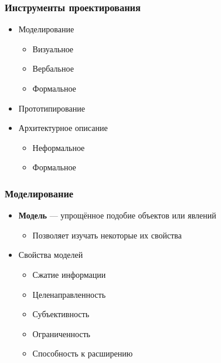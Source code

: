 \documentclass[xetex,mathserif,serif]{beamer}
\begin{document}
	\begin{frame}
		\frametitle{Инструменты проектирования}
		\begin{itemize}
			\item Моделирование
			\begin{itemize}
				\item Визуальное
				\item Вербальное
				\item Формальное
			\end{itemize}
			\item Прототипирование
			\item Архитектурное описание
			\begin{itemize}
				\item Неформальное
				\item Формальное
			\end{itemize}
		\end{itemize}
	\end{frame}

	\begin{frame}
		\frametitle{Моделирование}
		\begin{itemize}
			\item \textbf{Модель} --- упрощённое подобие объектов или явлений
			\begin{itemize}
				\item Позволяет изучать некоторые их свойства
			\end{itemize}
			\item Свойства моделей
			\begin{itemize}
				\item Сжатие информации
				\item Целенаправленность
				\item Субъективность
				\item Ограниченность
				\item Способность к расширению
			\end{itemize}
		\end{itemize}
	\end{frame}
\end{document}
